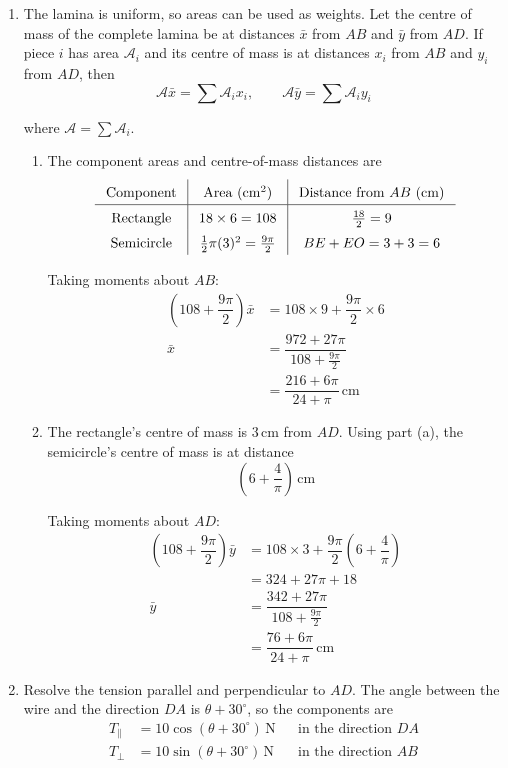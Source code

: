 \documentclass[leqno]{article}
\begin{document}
\begin{enumerate}[
  label=\textbf{\arabic*.},
  leftmargin=*,
  topsep=0pt,
  partopsep=0pt,
  parsep=0pt
]
\begin{djsSolution}
\begin{enumerate}[label=\textbf{(\alph*)}, start=1]
\item
The lamina is uniform, so areas can be used as weights. Let the centre of mass of the complete lamina be at distances \(\bar{x}\) from \(AB\) and \(\bar{y}\) from \(AD\). If piece \(i\) has area \(\mathcal{A}_i\) and its centre of mass is at distances \(x_i\) from \(AB\) and \(y_i\) from \(AD\), then
\[
\mathcal{A}\bar{x}=\sum\mathcal{A}_ix_i,\qquad \mathcal{A}\bar{y}=\sum\mathcal{A}_iy_i
\]

where \(\mathcal{A}=\sum\mathcal{A}_i\).

\begin{enumerate}[label=(\roman*), start=1]
\item The component areas and centre-of-mass distances are
\[
\renewcommand{\arraystretch}{1.5}
\setlength{\arraycolsep}{8pt}
\begin{array}{c|c|c}
\text{Component}&\text{Area }(\mathrm{cm^2})&\text{Distance from }AB\ (\mathrm{cm})\\
\hline
\text{Rectangle}&18\times6=108&\tfrac{18}{2}=9\\
\text{Semicircle}&\tfrac12\pi(3)^2=\tfrac{9\pi}{2}&BE+EO=3+3=6
\end{array}
\]

Taking moments about \(AB\):
\begin{align*}
\left(108+\dfrac{9\pi}{2}\right)\bar{x}
&=108\times9+\dfrac{9\pi}{2}\times6\\
\bar{x}&=\dfrac{972+27\pi}{108+\frac{9\pi}{2}}\\
&=\dfrac{216+6\pi}{24+\pi}\,\mathrm{cm}
\end{align*}

\item The rectangle's centre of mass is \(3\,\mathrm{cm}\) from \(AD\). Using part (a), the semicircle's centre of mass is at distance
\[
\left(6+\dfrac{4}{\pi}\right)\,\mathrm{cm}
\]

Taking moments about \(AD\):
\begin{align*}
\left(108+\dfrac{9\pi}{2}\right)\bar{y}
&=108\times3+\dfrac{9\pi}{2}\left(6+\dfrac{4}{\pi}\right)\\
&=324+27\pi+18\\
\bar{y}&=\dfrac{342+27\pi}{108+\frac{9\pi}{2}}\\
&=\dfrac{76+6\pi}{24+\pi}\,\mathrm{cm}
\end{align*}

\end{enumerate}
\item
Resolve the tension parallel and perpendicular to \(AD\). The angle between the wire and the direction \(DA\) is \(\theta+30^\circ\), so the components are
\begin{align*}
T_{\parallel}&=10\cos(\theta+30^\circ)\,\mathrm{N}
&&\text{in the direction }DA\\
T_{\perp}&=10\sin(\theta+30^\circ)\,\mathrm{N}
&&\text{in the direction }AB
\end{align*}


\end{enumerate}
\end{djsSolution}
\end{enumerate}
\end{document}
